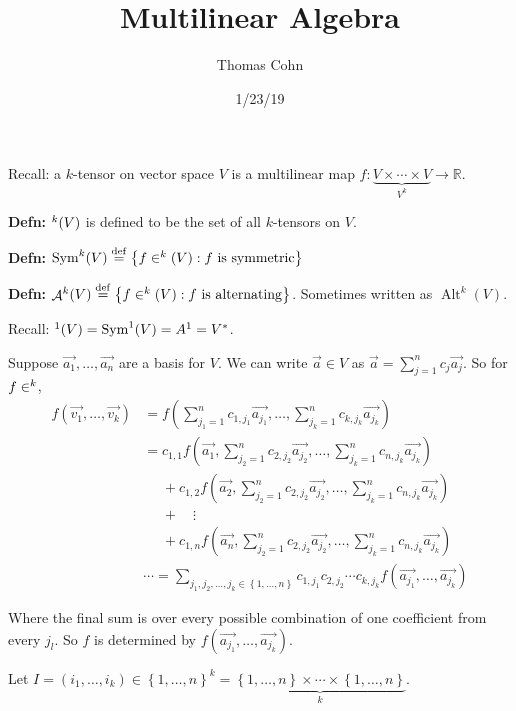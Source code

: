 \documentclass[10pt,letterpaper]{article}
\author{Thomas Cohn}
\title{Multilinear Algebra}
\date{1/23/19} %
\newcommand{\n}{\hfill\break}
\newcommand{\defn}[1]{\par\noindent\settowidth{\hangindent}{\textbf{Defn: }}\textbf{Defn: }#1\n}
\newcommand{\ptxt}[1]{\textrm{\textnormal{#1}}}
\newcommand{\set}[1]{\left\{#1\right\}}
\newcommand{\reals}{\mathbb{R}}
\newcommand{\R}{\reals}
\let\L\relax
\DeclareMathOperator{\L}{\mathscr{L}}
\DeclareMathOperator{\A}{\mathcal{A}}
\DeclareMathOperator{\Alt}{Alt}
\DeclareMathOperator{\Sym}{Sym}
\newcommand{\eqdef}{\overset{\ptxt{def}}{=}}
\newcommand{\paren}[1]{\left(#1\right)}
\begin{document}
\maketitle
\setlength\RaggedRightParindent{\parindent}
\RaggedRight

\par\noindent Recall: a $k$-tensor on vector space $V$ is a multilinear map $f:\underbrace{V\times\cdots\times{}V}_{V^{k}}\to\R$.

\defn{$\L^{k}(V)$ is defined to be the set of all $k$-tensors on $V$.}

\defn{$\Sym^{k}(V)\eqdef\set{f\in\L^{k}(V):f\ptxt{ is symmetric}}$}

\defn{$\A^{k}(V)\eqdef\set{f\in\L^{k}(V):f\ptxt{ is alternating}}$. Sometimes written as $\Alt^{k}(V)$.}

\par\noindent Recall: $\L^{1}(V)=\Sym^{1}(V)=A^{1}=V^{*}$.\n

\par\noindent Suppose $\vec{a_{1}},\ldots,\vec{a_{n}}$ are a basis for $V$. We can write $\vec{a}\in{}V$ as $\vec{a}=\sum_{j=1}^{n}c_{j}\vec{a_{j}}$. So for $f\in\L^{k}$,
\begin{align*}
	f(\vec{v_{1}},\ldots,\vec{v_{k}}) & =f\paren{\sum_{j_{1}=1}^{n}c_{1,j_{1}}\vec{a_{j_{1}}},\ldots,\sum_{j_{k}=1}^{n}c_{k,j_{k}}\vec{a_{j_{k}}}}\\
	& =c_{1,1}f\paren{\vec{a_{1}},\sum_{j_{2}=1}^{n}c_{2,j_{2}}\vec{a_{j_{2}}},\ldots,\sum_{j_{k}=1}^{n}c_{n,j_{k}}\vec{a_{j_{k}}}}\\
	& \phantom{=}+c_{1,2}f\paren{\vec{a_{2}},\sum_{j_{2}=1}^{n}c_{2,j_{2}}\vec{a_{j_{2}}},\ldots,\sum_{j_{k}=1}^{n}c_{n,j_{k}}\vec{a_{j_{k}}}}\\
	& \phantom{=}+\quad\vdots\\
	& \phantom{=}+c_{1,n}f\paren{\vec{a_{n}},\sum_{j_{2}=1}^{n}c_{2,j_{2}}\vec{a_{j_{2}}},\ldots,\sum_{j_{k}=1}^{n}c_{n,j_{k}}\vec{a_{j_{k}}}}\\
	& \cdots=\sum_{j_{1},j_{2},\ldots,j_{k}\in\set{1,\ldots,n}}c_{1,j_{1}}c_{2,j_{2}}\cdots{}c_{k,j_{k}}f(\vec{a_{j_{1}}},\ldots,\vec{a_{j_{k}}})
\end{align*}

\par\noindent Where the final sum is over every possible combination of one coefficient from every $j_{l}$.\n
So $f$ is determined by $f(\vec{a_{j_{1}}},\ldots,\vec{a_{j_{k}}})$.\n

\par\noindent Let $I=(i_{1},\ldots,i_{k})\in\set{1,\ldots,n}^{k}=\underbrace{\set{1,\ldots,n}\times\cdots\times\set{1,\ldots,n}}_{k}$.
\end{document}
